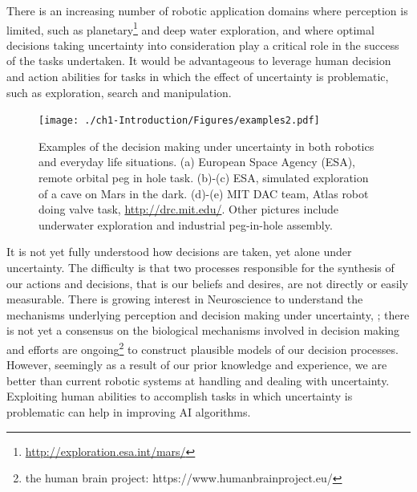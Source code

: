 There is an increasing number of robotic application domains where perception is limited, such as planetary\footnote{\url{http://exploration.esa.int/mars/}} 
and deep water exploration, and where optimal decisions taking uncertainty into consideration play a critical role in the success of the tasks undertaken. 
It would be advantageous to leverage human decision and action abilities for tasks in which the effect of uncertainty is problematic, such as exploration, search and manipulation.

\begin{figure}
 \centering
 \texttt{[image: ./ch1-Introduction/Figures/examples2.pdf]}
 \caption{Examples of the decision making under uncertainty in both robotics and everyday life situations. (a) European Space Agency (ESA), remote orbital peg in hole task. (b)-(c) 
 ESA, simulated exploration of a cave on Mars in the dark. (d)-(e) MIT DAC team, Atlas robot doing valve task, \url{http://drc.mit.edu/}. Other pictures include underwater 
 exploration and industrial peg-in-hole assembly.}
 \label{fig:ch1-example}
\end{figure}

It is not yet fully understood how decisions are taken, yet alone under uncertainty. The difficulty is that two processes responsible 
for the synthesis of our actions and decisions, that is our beliefs and desires, are not directly or easily measurable. There is growing interest in 
Neuroscience to understand the mechanisms underlying perception and decision making under uncertainty, \cite{decision_un_2013}; there is not 
yet a consensus on the biological mechanisms involved in decision making and efforts are ongoing\footnote{the human brain project: https://www.humanbrainproject.eu/} 
to construct plausible models of our decision processes. However, seemingly as a result of our prior knowledge and experience, 
we are better than current robotic systems at handling and dealing with uncertainty. Exploiting human abilities to accomplish 
tasks in which uncertainty is problematic can help in improving AI algorithms.

